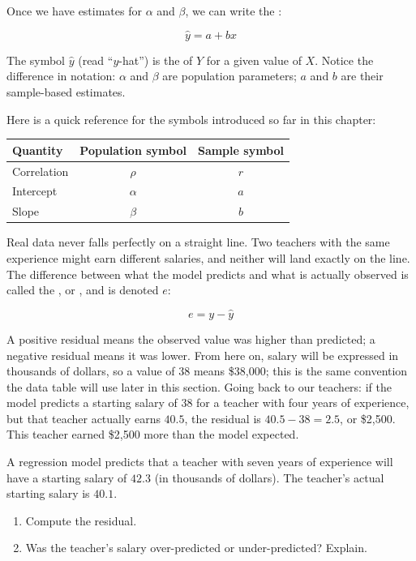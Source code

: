 Once we have estimates for $\alpha$ and $\beta$, we can write the
:

\[
\hat{y} = a + bx
\]

The symbol $\hat{y}$ (read ``$y$-hat'') is the 
of $Y$ for a given value of $X$. Notice the difference in notation: $\alpha$ and
$\beta$ are population parameters; $a$ and $b$ are their sample-based estimates.

Here is a quick reference for the symbols introduced so far in this chapter:

\begin{center}
\begin{tabular}{|l|c|c|}
\hline
\textbf{Quantity} & \textbf{Population symbol} & \textbf{Sample symbol} \\
\hline
Correlation & $\rho$ & $r$ \\
\hline
Intercept & $\alpha$ & $a$ \\
\hline
Slope & $\beta$ & $b$ \\
\hline
\end{tabular}
\end{center}



Real data never falls perfectly on a straight line. Two teachers with the same
experience might earn different salaries, and neither will land exactly on the
line. The difference between what
the model predicts and what is actually observed is called the
, or , and is denoted
$e$:

\[
e = y - \hat{y}
\]

A positive residual means the observed value was higher than predicted; a negative
residual means it was lower. From here on, salary will be expressed in thousands of
dollars, so a value of $38$ means \$38{,}000; this is the same convention the data
table will use later in this section. Going back to our teachers: if the model
predicts a starting salary of $38$ for a teacher with four years of experience, but
that teacher actually earns $40.5$, the residual is $40.5 - 38 = 2.5$, or \$2{,}500.
This teacher earned \$2{,}500 more than the model expected.

\begin{Exercise}[title={Computing a Residual}, label={ex:lr_residual}]
A regression model predicts that a teacher with seven years of experience will have
a starting salary of $42.3$ (in thousands of dollars). The teacher's actual starting
salary is $40.1$.
\begin{enumerate}
    \item Compute the residual.
    \item Was the teacher's salary over-predicted or under-predicted? Explain.
\end{enumerate}
\end{Exercise}

